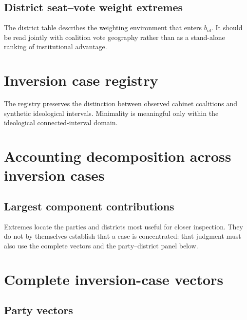 \documentclass[11pt]{article}
\newcommand{\ReportLatexRoot}{../../output/decomposition/latex/report}
\begin{document}


\subsection{District seat--vote weight extremes}

The district table describes the weighting environment that enters $b_{id}$.
It should be read jointly with coalition vote geography rather than as a
stand-alone ranking of institutional advantage.



\section{Inversion case registry}

The registry preserves the distinction between observed cabinet coalitions and
synthetic ideological intervals. Minimality is meaningful only within the
ideological connected-interval domain.



\section{Accounting decomposition across inversion cases}



\subsection{Largest component contributions}

Extremes locate the parties and districts most useful for closer inspection.
They do not by themselves establish that a case is concentrated: that judgment
must also use the complete vectors and the party--district panel below.



\section{Complete inversion-case vectors}

\subsection{Party vectors}
\end{document}
